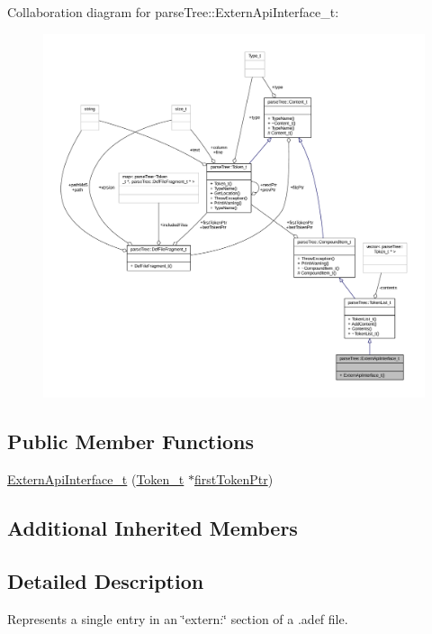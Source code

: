 Collaboration diagram for parse\+Tree\+:\+:Extern\+Api\+Interface\+\_\+t\+:
\nopagebreak
\begin{figure}[H]
\begin{center}
\leavevmode
\includegraphics[width=350pt]{structparse_tree_1_1_extern_api_interface__t__coll__graph}
\end{center}
\end{figure}
\subsection*{Public Member Functions}
\begin{DoxyCompactItemize}
\item 
\hyperlink{structparse_tree_1_1_extern_api_interface__t_a6c4188d93365e850760e3c03bceb495c}{Extern\+Api\+Interface\+\_\+t} (\hyperlink{structparse_tree_1_1_token__t}{Token\+\_\+t} $\ast$\hyperlink{structparse_tree_1_1_compound_item__t_a587020c943e760cb0152dd8cd31e21ef}{first\+Token\+Ptr})
\end{DoxyCompactItemize}
\subsection*{Additional Inherited Members}


\subsection{Detailed Description}
Represents a single entry in an \char`\"{}extern\+:\char`\"{} section of a .adef file. 

